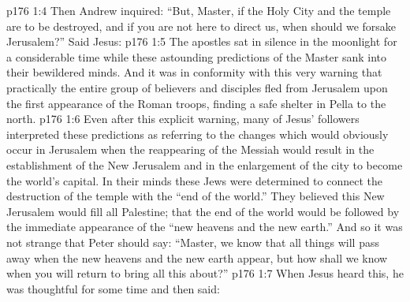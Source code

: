 \vs p176 1:4 Then Andrew inquired: “But, Master, if the Holy City and the temple are to be destroyed, and if you are not here to direct us, when should we forsake Jerusalem?” Said Jesus: 
\vs p176 1:5 The apostles sat in silence in the moonlight for a considerable time while these astounding predictions of the Master sank into their bewildered minds. And it was in conformity with this very warning that practically the entire group of believers and disciples fled from Jerusalem upon the first appearance of the Roman troops, finding a safe shelter in Pella to the north.
\vs p176 1:6 Even after this explicit warning, many of Jesus’ followers interpreted these predictions as referring to the changes which would obviously occur in Jerusalem when the reappearing of the Messiah would result in the establishment of the New Jerusalem and in the enlargement of the city to become the world’s capital. In their minds these Jews were determined to connect the destruction of the temple with the “end of the world.” They believed this New Jerusalem would fill all Palestine; that the end of the world would be followed by the immediate appearance of the “new heavens and the new earth.” And so it was not strange that Peter should say: “Master, we know that all things will pass away when the new heavens and the new earth appear, but how shall we know when you will return to bring all this about?”
\vs p176 1:7 When Jesus heard this, he was thoughtful for some time and then said: 
